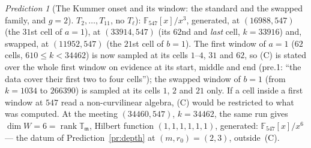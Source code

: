 \documentclass[11pt]{article}
\theoremstyle{remark}
\newtheorem{prediction}[theorem]{Prediction}
\newcommand{\F}{\mathbb{F}}
\DeclareMathOperator{\rank}{rank}
\newcommand{\T}{\mathbb{T}}
\newcommand{\m}{\mathfrak{m}}
\begin{document}
\begin{prediction}[The Kummer onset and its window: the standard and the swapped family, and $g=2$]
$T_2,\dots,T_{11}$, no $T_\ell$): $\F_{547}[x]/x^3$, generated, at $(16988,547)$ (the $31$st cell of $a=1$), at $(33914,547)$ (its $62$nd and \emph{last} cell,
$k=33916$) and, swapped, at $(11952,547)$ (the $21$st cell of $b=1$). The first window of $a=1$ ($62$ cells, $610\le k<34462$) is now sampled at its cells
$1$--$4$, $31$ and $62$, so (C) is stated over the whole first window on evidence at its start, middle and end (pre.1: ``the data cover their first two to four
cells''); the swapped window of $b=1$ (from $k=1034$ to $266390$) is sampled at its cells $1$, $2$ and $21$ only. If a cell inside a first window at
$547$ read a non-curvilinear algebra, (C) would be restricted to what was computed. At the meeting $(34460,547)$, $k=34462$, the same run gives
$\dim W=6=\rank\T_\m$, Hilbert function $(1,1,1,1,1,1)$, generated: $\F_{547}[x]/x^6$ --- the datum of Prediction~\ref{pr:depth} at $(m,r_0)=(2,3)$, outside~(C).


\end{prediction}
\end{document}
